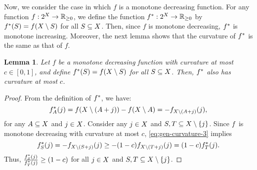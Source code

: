 \documentclass{article}
\newcommand{\reals}{\ensuremath{\mathbb{R}}}
\newcommand{\posreals}{\ensuremath{\reals_{\ge 0}}}
\newtheorem{lemma}[theorem]{Lemma}
\theoremstyle{definition}
\begin{document}
Now, we consider the case in which $f$ is a monotone decreasing function.  For any function $f : 2^\ground \to \posreals$, we define the function $\fdual : 2^\ground \to \posreals$ by $f^{*}(S) = f(X \setminus S)$ for all $S \subseteq X$.  Then, since $f$ is monotone decreasing, $f^{*}$ is monotone increasing.  Moreover, the next lemma shows that the curvature of $f^{*}$ is the same as that of $f$.

\begin{lemma}
\label{lem:increasing-decreasing-curvature}
Let $f$ be a monotone decreasing function with curvature at most $c \in [0,1]$, and define $f^{*}(S) = f(X \setminus S)$ for all $S \subseteq X$.  Then, $f^{*}$ also has curvature at most $c$.
\end{lemma}
\begin{proof}
From the definition of $f^{*}$, we have:
\[
f^{*}_A(j) = f(X \setminus (A + j)) - f(X \setminus A) = -f_{X\setminus (A + j)}(j),
\]
for any $A \subseteq X$ and $j \in X$.  Consider any $j \in X$ and $S,T \subseteq X \setminus \{j\}$.   Since $f$ is monotone decreasing with curvature at most $c$, \eqref{eq:gen-curvature-3} implies
\begin{equation*} 
f^{*}_{S}(j)
= -f_{X \setminus (S + j)}(j)
\ge
-(1-c)f_{X \setminus (T + j)}(j)
= (1-c)f^{*}_T(j).
\end{equation*}
Thus, $\frac{f^{*}_S(j)}{f^{*}_T(j)} \ge (1-c)$ for all $j \in X$ and $S,T \subseteq X \setminus \{j\}$.
\end{proof}
\end{document}
